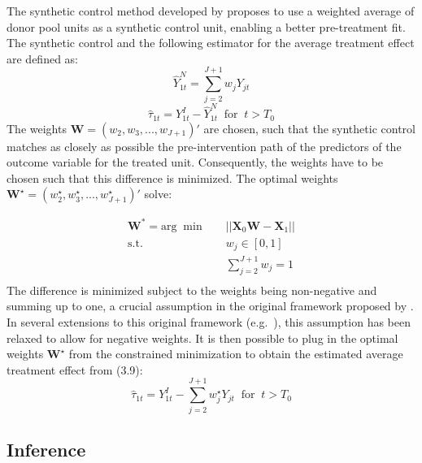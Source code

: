 \documentclass{scrbook}
\begin{document}
The synthetic control method developed by
\textcite{abadie_economic_2003} proposes to use a weighted average of
donor pool units as a synthetic control unit, enabling a better
pre-treatment fit. The synthetic control and the following estimator for
the average treatment effect are defined as: \begin{equation}
\hat{Y}_{1t}^{N}=\sum_{j=2}^{J+1} w_{j}Y_{jt}
\end{equation} \begin{equation}
\hat{\tau}_{1t}=Y_{1t}^{I}-\hat{Y}_{1t}^{N}\; \; \text{for}\; \; t>T_{0}
\end{equation} The weights \(\mathbf{W}=(w_{2},w_{3},...,w_{J+1})'\) are
chosen, such that the synthetic control matches as closely as possible
the pre-intervention path of the predictors of the outcome variable for
the treated unit. Consequently, the weights have to be chosen such that
this difference is minimized. The optimal weights
\(\mathbf{W}^{\star}=(w_{2}^{\star},w_{3}^{\star},...,w_{J+1}^{\star})'\)
solve:

\begin{equation}   
\begin{aligned}
\mathbf{W}^{*}=\text{arg}\; \min \quad & \vert\vert\mathbf{X}_{0}\mathbf{W}-\mathbf{X}_{1}\vert\vert\\
\textrm{s.t.} \quad & w_{j}\in[0,1]\\
  &\sum_{j=2}^{J+1} w_{j}=1   \\
\end{aligned}
\end{equation} The difference is minimized subject to the weights being
non-negative and summing up to one, a crucial assumption in the original
framework proposed by \textcite{abadie_economic_2003}. In several
extensions to this original framework
(e.g.~\textcite{doudchenko_balancing_2016}), this assumption has been
relaxed to allow for negative weights. It is then possible to plug in
the optimal weights \(\mathbf{W}^{\star}\) from the constrained
minimization to obtain the estimated average treatment effect from
(3.9): \begin{equation}
\hat{\tau}_{1t}=Y_{1t}^{I}-\sum_{j=2}^{J+1} w_{j}^{\star}Y_{jt}\; \; \text{for}\; \; t>T_{0}
\end{equation}

\subsection*{Inference}
\end{document}
